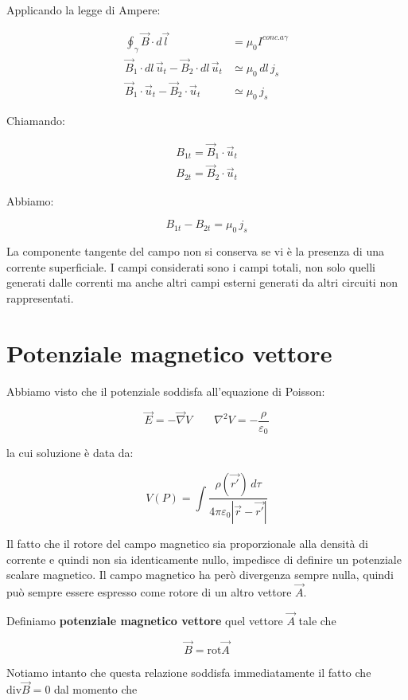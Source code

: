 Applicando la legge di Ampere:

\begin{align*}
	\oint_{\gamma} \vec{B} \cdot d\vec{l}  &= \mu_0 I^{conc. a \gamma}  \\
	\vec{B}_1\cdot dl \, \vec{u}_t - \vec{B}_2\cdot dl \, \vec{u}_t &\simeq \mu_0 \, dl \, j_s  \\
	\vec{B}_1\cdot  \vec{u}_t - \vec{B}_2\cdot  \vec{u}_t &\simeq \mu_0  \, j_s
\end{align*}

Chiamando:

\begin{gather*}
	B_{1t} = \vec{B}_1\cdot \vec{u}_t \\
	B_{2t} = \vec{B}_2\cdot \vec{u}_t
\end{gather*}

Abbiamo:

\[
	\boxed{B_{1t}-B_{2t} = \mu_0  \, j_s}
\]

La componente tangente del campo non si conserva se vi è la presenza di una corrente superficiale. I campi considerati sono i campi totali, non solo quelli generati dalle correnti ma anche altri campi esterni generati da altri circuiti non rappresentati.

\section{Potenziale magnetico vettore}

Abbiamo visto che il potenziale soddisfa all'equazione di Poisson:

\[
	\vec{E} = - \vec{\nabla} V \qquad \nabla^2 V = -\frac{\rho}{\varepsilon_0}
\]

la cui soluzione è data da:

\[
	V(P) = \int \frac{\rho (\vec{r'})\,d\tau}{4\pi \varepsilon_0 |\vec{r} -\vec{r'} |}
\]

Il fatto che il rotore del campo magnetico sia proporzionale alla densità di corrente e quindi non sia identicamente nullo, impedisce di definire un potenziale scalare magnetico. Il campo magnetico ha però divergenza sempre nulla, quindi può sempre essere espresso come rotore di un altro vettore $\vec{A}$.

Definiamo \textbf{potenziale magnetico vettore} quel vettore $ \vec{A}  $ tale che

\[
	\boxed{\vec{B} = \text{rot}\vec{A}}
\]

Notiamo intanto che questa relazione soddisfa immediatamente il fatto che $ \text{div}\vec{B} =0 $ dal momento che

